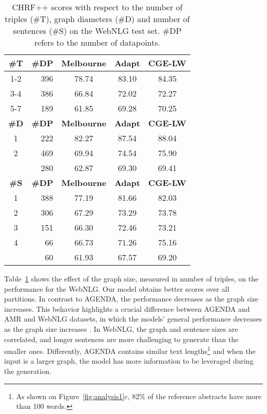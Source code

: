\documentclass[11pt,a4paper]{article}
\begin{document}
\begin{table}
\centering
{\renewcommand{\arraystretch}{0.8}
\setlength{\belowrulesep}{1.3pt}
\setlength{\aboverulesep}{1pt}
\begin{tabular}{@{\hspace*{1.5mm}}c@{\hspace*{2mm}}r@{\hspace*{2mm}}c@{\hspace*{5mm}}c@{\hspace*{5mm}}c@{\hspace*{1.5mm}}}  
\toprule
\textbf{\#T} & \textbf{\#DP} & \textbf{Melbourne} & \textbf{Adapt} & \textbf{CGE-LW}   \\
\midrule
1-2 & 396 & 78.74 & 83.10 & 84.35 \\
3-4 & 386 & 66.84 & 72.02 & 72.27 \\
5-7 & 189 & 61.85 & 69.28 & 70.25 \\
\midrule
\textbf{\#D} & \textbf{\#DP} & \textbf{Melbourne} & \textbf{Adapt} & \textbf{CGE-LW}   \\
\midrule
1 & 222 & 82.27 & 87.54 & 88.04 \\
2 & 469 & 69.94 & 74.54 & 75.90 \\
 & 280 & 62.87 & 69.30 & 69.41 \\
\midrule
\textbf{\#S} & \textbf{\#DP} & \textbf{Melbourne} & \textbf{Adapt} & \textbf{CGE-LW}   \\
\midrule
1 & 388 & 77.19 & 81.66 & 82.03  \\
2 & 306 & 67.29 & 73.29 & 73.78 \\
3 & 151 & 66.30 & 72.46 & 73.21 \\
4 & 66 & 66.73 & 71.26 & 75.16 \\
 & 60 & 61.93 & 67.57 & 69.20 \\
\bottomrule
\end{tabular}}
\caption{CHRF++ scores with respect to the number of triples (\#T), graph diameters (\#D) and number of sentences (\#S) on the WebNLG test set. \#DP refers to the number of datapoints.}
\label{tab:webnlg-stats}
\end{table}

Table~\ref{tab:webnlg-stats} shows the effect of the graph size, measured in number of triples, on the performance for the WebNLG. Our model obtains better scores over all partitions. In contrast to AGENDA, the performance decreases as the graph size increases. This behavior highlights a crucial difference between AGENDA and AMR and WebNLG datasets, in which the models' general performance decreases as the graph size increases \cite{gardent-etal-2017-webnlg,cai-lam-2020-graph}. In WebNLG, the graph and sentence sizes are correlated, and longer sentences are more challenging to generate than the smaller ones. Differently, AGENDA contains similar text lengths\footnote{As shown on Figure~\ref{fig:analysis1}c, 82\% of the reference abstracts have more than 100 words.} and when the input is a larger graph, the model has more information to be leveraged during the generation. 
\end{document}
